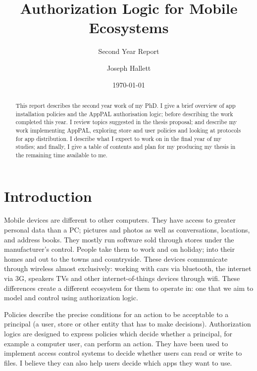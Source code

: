 \documentclass[a4paper]{scrartcl}
\title{Authorization Logic for Mobile Ecosystems}
\subtitle{Second Year Report}
\author{Joseph Hallett}
\date\today
\begin{document}
\maketitle

\begin{abstract}
  This report describes the second year work of my PhD.
  I give a brief overview of app installation policies and the AppPAL authorisation logic; before describing the work completed this year.
  I review topics suggested in the thesis proposal; and describe my work implementing AppPAL, exploring store and user policies and looking at protocols for app distribution.
  I describe what I expect to work on in the final year of my studies; and finally, I give a table of contents and plan for my producing my thesis in the remaining time available to me.
\end{abstract}

\section{Introduction}

Mobile devices are different to other computers.
They have access to greater personal data than a PC; pictures and photos as well as conversations, locations, and address books.
They mostly run software sold through stores under the manufacturer's control.
People take them to work and on holiday; into their homes and out to the towns and countryside.
These devices communicate through wireless almost exclusively: working with cars via bluetooth, the internet via 3G, speakers TVs and other internet-of-things devices through wifi.
These differences create a different ecosystem for them to operate in: one that we aim to model and control using authorization logic.

Policies describe the precise conditions for an action to be acceptable to a principal (a user, store or other entity that has to make decisions).
Authorization logics are designed to express policies which decide whether a principal, for example a computer user, can perform an action.
They have been used to implement access control systems to decide whether users can read or write to files.
I believe they can also help users decide which apps they want to use.
\end{document}
